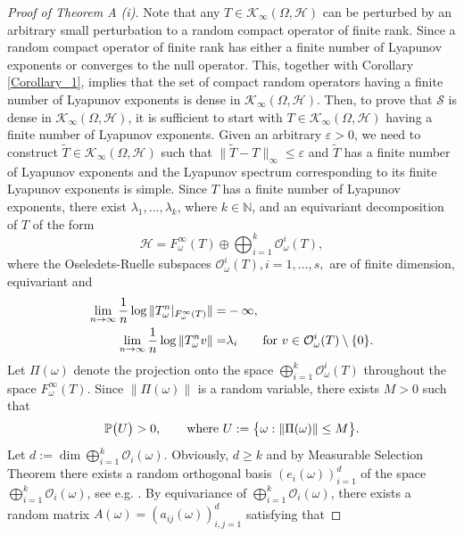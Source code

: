 \documentclass[pdflatex,sn-mathphys-num]{sn-jnl}%
\theoremstyle{thmstyleone}%
\theoremstyle{thmstyletwo}%
\theoremstyle{thmstylethree}%
\newcommand{\N}{\mathbb{N}}
\newcommand{\mP}{\mathbb{P}}
\newcommand{\cS}{\mathcal{S}}
\newcommand{\eps}{\varepsilon}
\numberwithin{equation}{section}
\begin{document}
\begin{proof}[Proof of Theorem A (i)]
Note that any $T\in \mathcal K_{\infty}(\Omega,\mathcal H)$  can be perturbed by an arbitrary small perturbation to a random compact operator of finite rank. Since a random compact operator of finite rank has either a finite number of Lyapunov exponents or converges to the null operator. This, together with Corollary \ref{Corollary_1}, implies that the set of compact random operators having a finite number of Lyapunov exponents is dense in $ \mathcal K_{\infty}(\Omega,\mathcal H)$. Then, to prove that $\cS$ is dense in $ \mathcal K_{\infty}(\Omega,\mathcal H)$,  it is sufficient to start with $T\in \mathcal K_{\infty}(\Omega,\mathcal H)$ having a finite number of Lyapunov exponents. Given an arbitrary $\eps>0$, we need to construct $\widetilde T\in \mathcal K_{\infty}(\Omega,\mathcal H)$ such that $\|\widetilde T-T\|_{\infty}\leq \eps$ and $\widetilde T$ has a finite number of Lyapunov exponents and the Lyapunov spectrum corresponding to its finite Lyapunov exponents is simple. Since $T$ has a finite number of Lyapunov exponents, there exist $\lambda_1,\dots,\lambda_k$, where $k\in\N$, and an equivariant decomposition of $T$ of the form 
	\[
	\mathcal H= F^{\infty}_{\omega}(T)\oplus \bigoplus_{i=1}^{k} \mathcal O^i_{\omega}(T),
	\]
where the Oseledets-Ruelle subspaces $\mathcal O^i_{\omega}(T), i=1,\dots,s,$ are of finite dimension, equivariant and
	\begin{align}
	\lim_{n\to\infty}\frac{1}{n}\log\|T^n_{\omega}|_{F_{\omega}^{\infty}(T)}\|=&
		-\infty,\label{Minusinfinity}\\
	\lim_{n\to\infty}\frac{1}{n}\log\|T^n_{\omega}v\|
	=&\lambda_i\qquad\hbox{for } v\in\mathcal O^i_{\omega}(T)\setminus\{0\}.\notag
	\end{align}
Let $\Pi(\omega)$ denote the projection onto the space $ \bigoplus_{i=1}^{k} \mathcal O^i_{\omega}(T)$ throughout the space $ F^{\infty}_{\omega}(T)$. Since $\|\Pi(\omega)\|$ is a random variable, there exists $M>0$ such that
\begin{equation}\label{Eq1}
\mP\big(U\big)>0,\qquad\hbox{where } U:=\big\{\omega: \|\Pi(\omega)\|\leq M\big\}.
\end{equation}
Let $d:=\dim \bigoplus_{i=1}^k\mathcal O_i(\omega)$. Obviously, $d\geq k$ and by Measurable Selection Theorem there exists a random orthogonal basis $(e_i(\omega))_{i=1}^d$ of the space $\bigoplus_{i=1}^k\mathcal O_i(\omega)$, see e.g. \cite{Arnold}. By equivariance of $\bigoplus_{i=1}^k\mathcal O_i(\omega)$, there exists a random matrix $A(\omega)=(a_{ij}(\omega))_{i,j=1}^d$ satisfying that

\end{proof}
\end{document}
